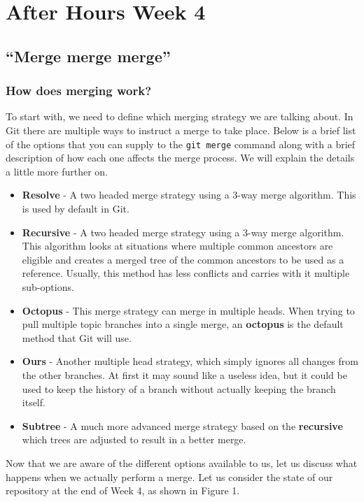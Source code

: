 \chapter{After Hours Week 4}
\section{``Merge merge merge''}
\subsection{How does merging work?}
To start with, we need to define which merging strategy we are talking about.
In Git there are multiple ways to instruct a merge to take place.
Below is a brief list of the options that you can supply to the \texttt{git merge} command along with a brief description of how each one affects the merge process.
We will explain the details a little more further on.

\begin{itemize}
\item\textbf{Resolve} - A two headed merge strategy using a 3-way merge algorithm.
This is used by default in Git.
\item\textbf{Recursive} - A two headed merge strategy using a 3-way merge algorithm.
This algorithm looks at situations where multiple common ancestors are eligible and creates a merged tree of the common ancestors to be used as a reference.
Usually, this method has less conflicts and carries with it multiple sub-options.
\item\textbf{Octopus} - This merge strategy can merge in multiple heads.
When trying to pull multiple topic branches into a single merge, an \textbf{octopus} is the default method that Git will use.
\item\textbf{Ours} - Another multiple head strategy, which simply ignores all changes from the other branches.
At first it may sound like a useless idea, but it could be used to keep the history of a branch without actually keeping the branch itself.
\item\textbf{Subtree} - A much more advanced merge strategy based on the \textbf{recursive} which trees are adjusted to result in a better merge.
\end{itemize}

Now that we are aware of the different options available to us, let us discuss what happens when we actually perform a merge.
Let us consider the state of our repository at the end of Week 4, as shown in Figure 1.

